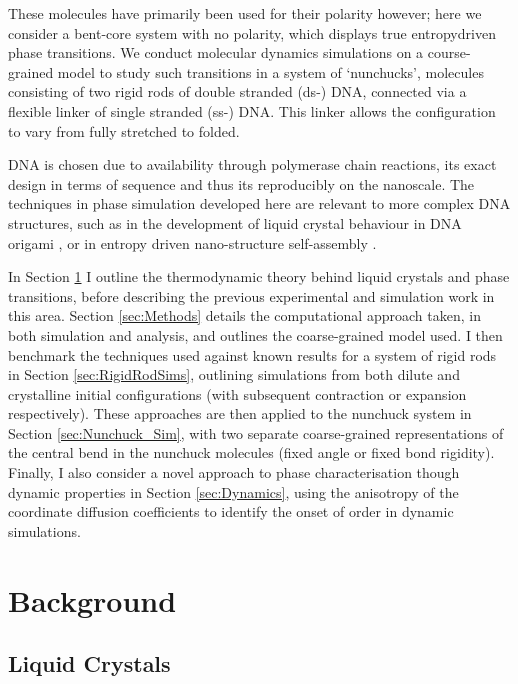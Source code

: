 \documentclass[11pt, a4paper]{article} %
\begin{document}
These molecules have primarily been used for their polarity however; here we consider a bent-core system with no polarity, which displays true entropy\textendash driven phase transitions. We conduct molecular dynamics simulations on a course-grained model to study such transitions in a system of ‘nunchucks’, molecules consisting of two rigid rods of double stranded (ds-) DNA, connected via a flexible linker of single stranded (ss-) DNA. This linker allows the configuration to vary from fully stretched to folded. 

DNA is chosen due to availability through polymerase chain reactions, its exact design in terms of sequence and thus its reproducibly on the nanoscale. The techniques in phase simulation developed here are relevant to more complex DNA structures, such as in the development of liquid crystal behaviour in DNA origami \cite{Cha2015,Wang2018}, or in entropy driven nano-structure self-assembly \cite{Barry2010, Lin2000}.

In Section \ref{sec:Background} I outline the thermodynamic theory behind liquid crystals and phase transitions, before describing the previous experimental and simulation work in this area. Section \ref{sec:Methods} details the computational approach taken, in both simulation and analysis, and outlines the coarse-grained model used. I then benchmark the techniques used against known results for a system of rigid rods in Section \ref{sec:RigidRodSims}, outlining simulations from both dilute and crystalline initial configurations (with subsequent contraction or expansion respectively). These approaches are then applied to the nunchuck system in Section \ref{sec:Nunchuck_Sim}, with two separate coarse-grained representations of the central bend in the nunchuck molecules (fixed angle or fixed bond rigidity). Finally, I also consider a novel approach to phase characterisation though dynamic properties in Section \ref{sec:Dynamics}, using the anisotropy of the coordinate diffusion coefficients to identify the onset of order in dynamic simulations.


\section{Background} \label{sec:Background}
\subsection{Liquid Crystals}
\end{document}
